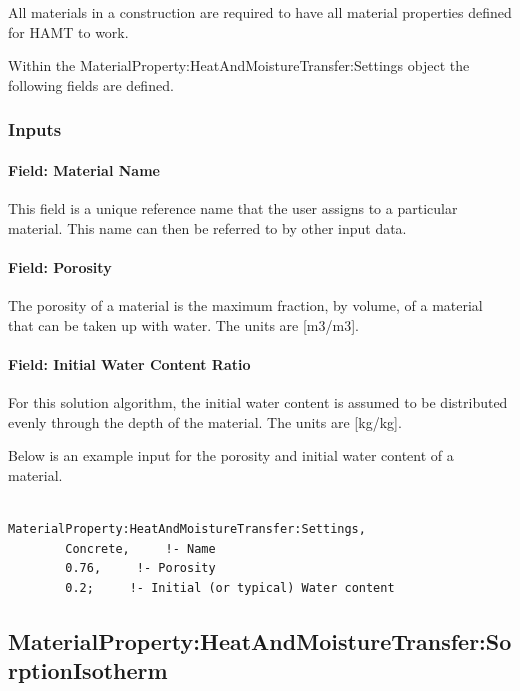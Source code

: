 All materials in a construction are required to have all material properties defined for HAMT to work.

Within the MaterialProperty:HeatAndMoistureTransfer:Settings object the following fields are defined.

\subsubsection{Inputs}\label{inputs-7-026}

\paragraph{Field: Material Name}\label{field-material-name-000}

This field is a unique reference name that the user assigns to a particular material. This name can then be referred to by other input data.

\paragraph{Field: Porosity}\label{field-porosity}

The porosity of a material is the maximum fraction, by volume, of a material that can be taken up with water. The units are {[}m3/m3{]}.

\paragraph{Field: Initial Water Content Ratio}\label{field-initial-water-content-ratio}

For this solution algorithm, the initial water content is assumed to be distributed evenly through the depth of the material. The units are {[}kg/kg{]}.

Below is an example input for the porosity and initial water content of a material.

\begin{lstlisting}

MaterialProperty:HeatAndMoistureTransfer:Settings,
        Concrete,     !- Name
        0.76,     !- Porosity
        0.2;     !- Initial (or typical) Water content
\end{lstlisting}

\subsection{MaterialProperty:HeatAndMoistureTransfer:SorptionIsotherm}\label{materialpropertyheatandmoisturetransfersorptionisotherm}

